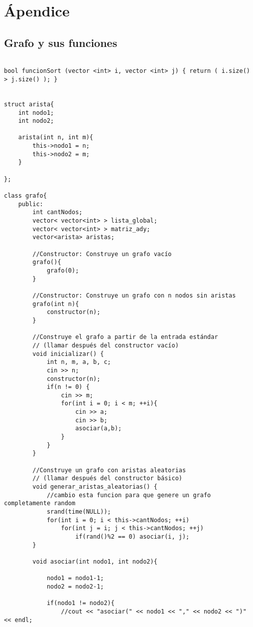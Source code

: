 \section{\'Apendice}

\subsection {Grafo y sus funciones}
\begin{lstlisting}

bool funcionSort (vector <int> i, vector <int> j) { return ( i.size() > j.size() ); }


struct arista{
    int nodo1;
    int nodo2;

    arista(int n, int m){
        this->nodo1 = n;
        this->nodo2 = m;
    }

};

class grafo{
    public:
        int cantNodos;
        vector< vector<int> > lista_global;
        vector< vector<int> > matriz_ady;
        vector<arista> aristas;

        //Constructor: Construye un grafo vacío
        grafo(){
            grafo(0);
        }

        //Constructor: Construye un grafo con n nodos sin aristas
        grafo(int n){
            constructor(n);
        }

        //Construye el grafo a partir de la entrada estándar
        // (llamar después del constructor vacío)
        void inicializar() {
            int n, m, a, b, c;
            cin >> n;
            constructor(n);
            if(n != 0) {
                cin >> m;
                for(int i = 0; i < m; ++i){
                    cin >> a;
                    cin >> b;
                    asociar(a,b);
                }
            }
        }

        //Construye un grafo con aristas aleatorias
        // (llamar después del constructor básico)
        void generar_aristas_aleatorias() {
            //cambio esta funcion para que genere un grafo completamente random
            srand(time(NULL));
            for(int i = 0; i < this->cantNodos; ++i)
                for(int j = i; j < this->cantNodos; ++j)
                    if(rand()%2 == 0) asociar(i, j);
        }

        void asociar(int nodo1, int nodo2){
            
            nodo1 = nodo1-1;
            nodo2 = nodo2-1;
            
            if(nodo1 != nodo2){
                //cout << "asociar(" << nodo1 << "," << nodo2 << ")" << endl;


\end{lstlisting}
